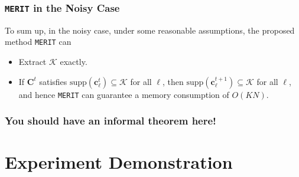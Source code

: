 \documentclass[10pt,xcolor={usenames,dvipsnames,table}]{beamer}
\newcommand\coolover[2]{\mathrlap{\smash{\overbrace{\phantom{%
    \begin{matrix} #2 \end{matrix}}}^{\mbox{$#1$}}}}#2}
\newcommand{\tikzmarkx}[2]{\tikz[overlay,remember picture,
  baseline=(#1.base)] \node (#1) {#2};}
\newcommand{\Highlight}[1][submatrix]{%
    \tikz[overlay,remember picture]{
    \node[highlight,fit=(left.north west) (right.south east)] (#1) {};}
}
\begin{document}
%



\begin{frame}
    \frametitle{\texttt{MERIT} in the Noisy Case}
    To sum up, in the noisy case, under some reasonable assumptions, the proposed method \texttt{MERIT} can
    \begin{itemize}
        \item Extract $\mathcal{K}$ exactly.
        \item If $\bm{C}^{t}$ satisfies $\text{supp}(\bm{c}_\ell^{t}) \subseteq \mathcal{K}$ for all $\ell$, then $\text{supp}(\bm{c}_\ell^{t+1}) \subseteq \mathcal{K}$ for all $\ell$, and hence \texttt{MERIT} can guarantee a memory consumption of $O(KN)$.
    \end{itemize}
\end{frame}


\begin{frame}
    \frametitle{You should have an informal theorem here!}
\end{frame}

\section{Experiment Demonstration}%
\label{sec:real_demonstration}
\end{document}
